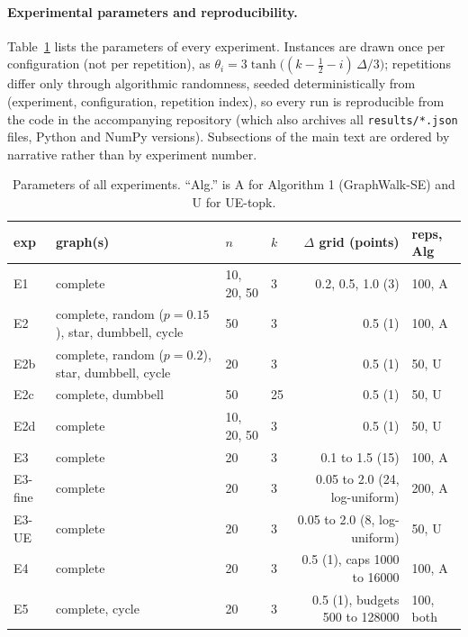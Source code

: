 \documentclass[11pt]{article}
\begin{document}
\paragraph{Experimental parameters and reproducibility.}
Table~\ref{tab:params} lists the parameters of every experiment.  Instances are drawn once per configuration (not per repetition), as $\theta_i=3\tanh\big((k-\tfrac12-i)\,\Delta/3\big)$; repetitions differ only through algorithmic randomness, seeded deterministically from (experiment, configuration, repetition index), so every run is reproducible from the code in the accompanying repository (which also archives all \texttt{results/*.json} files, Python and NumPy versions).  Subsections of the main text are ordered by narrative rather than by experiment number.
\begin{table}[t]\centering\small
\caption{Parameters of all experiments.  ``Alg.'' is A for Algorithm 1 (GraphWalk-SE) and U for UE-topk.}
\label{tab:params}
\begin{tabular}{llllrl}
\toprule
exp & graph(s) & $n$ & $k$ & $\Delta$ grid (points) & reps, Alg \\\midrule
E1 & complete & 10, 20, 50 & 3 & 0.2, 0.5, 1.0 (3) & 100, A \\
E2 & complete, random ($p{=}0.15$), star, dumbbell, cycle & 50 & 3 & 0.5 (1) & 100, A \\
E2b & complete, random ($p{=}0.2$), star, dumbbell, cycle & 20 & 3 & 0.5 (1) & 50, U \\
E2c & complete, dumbbell & 50 & 25 & 0.5 (1) & 50, U \\
E2d & complete & 10, 20, 50 & 3 & 0.5 (1) & 50, U \\
E3 & complete & 20 & 3 & 0.1 to 1.5 (15) & 100, A \\
E3-fine & complete & 20 & 3 & 0.05 to 2.0 (24, log-uniform) & 200, A \\
E3-UE & complete & 20 & 3 & 0.05 to 2.0 (8, log-uniform) & 50, U \\
E4 & complete & 20 & 3 & 0.5 (1), caps 1000 to 16000 & 100, A \\
E5 & complete, cycle & 20 & 3 & 0.5 (1), budgets 500 to 128000 & 100, both \\
\bottomrule
\end{tabular}
\end{table}
\end{document}
